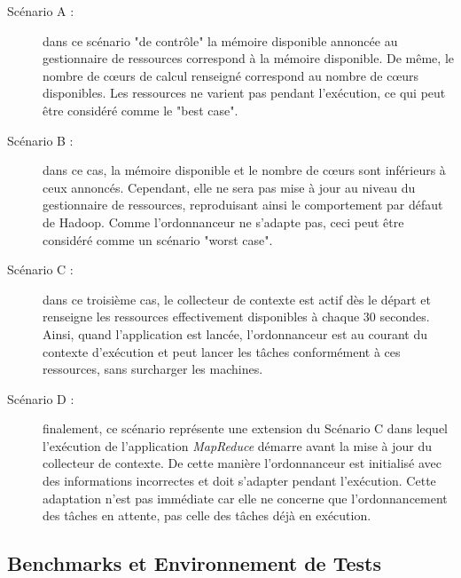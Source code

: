 \begin{description}
	\item[Scénario A :] dans ce scénario "de contrôle" la mémoire disponible annoncée au gestionnaire de ressources correspond à la mémoire disponible. De même, le nombre de c{\oe}urs de calcul renseigné correspond au nombre de c{\oe}urs disponibles. Les ressources ne varient pas pendant l'exécution, ce qui peut être considéré comme le "best case". 
	\item[Scénario B :] dans ce cas, la mémoire disponible et le nombre de c{\oe}urs sont inférieurs à ceux annoncés. Cependant, elle ne sera pas mise à jour au niveau du gestionnaire de ressources, reproduisant ainsi le comportement par défaut de Hadoop. Comme l'ordonnanceur ne s'adapte pas, ceci peut être considéré comme un scénario "worst case".
	\item[Scénario C :] dans ce troisième cas, le collecteur de contexte est actif dès le départ et renseigne les ressources effectivement disponibles à chaque 30 secondes. Ainsi, quand l'application est lancée, l'ordonnanceur est au courant du contexte d'exécution et peut lancer les tâches conformément à ces ressources, sans surcharger les machines. 
	\item[Scénario D :] finalement, ce scénario représente une extension du Scénario C dans lequel l'exécution de l'application \textit{MapReduce} démarre avant la mise à jour du collecteur de contexte. De cette manière l'ordonnanceur est initialisé avec des informations incorrectes et doit s'adapter pendant l'exécution. Cette adaptation n'est pas immédiate car elle ne concerne que l'ordonnancement des tâches en attente, pas celle des tâches déjà en exécution.
\end{description}


\subsection{Benchmarks et Environnement de Tests}

